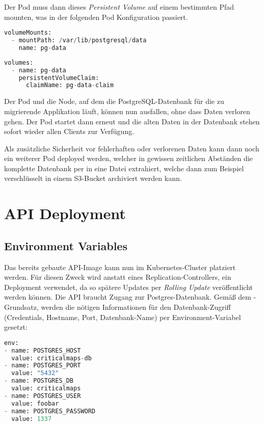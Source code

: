 Der Pod muss dann dieses \emph{Persistent Volume} auf einem bestimmten Pfad
mounten, was in der folgenden Pod Konfiguration passiert.

\begin{lstlisting}[language=Python,numbers=none]
volumeMounts:
  - mountPath: /var/lib/postgresql/data
    name: pg-data\end{lstlisting}
\begin{lstlisting}[language=Python,numbers=none]
volumes:
  - name: pg-data
    persistentVolumeClaim:
      claimName: pg-data-claim\end{lstlisting}

Der Pod und die Node, auf dem die PostgreSQL-Datenbank für die zu
migrierende Applikation läuft, können nun ausfallen, ohne dass Daten verloren
gehen. Der Pod startet dann erneut und die alten Daten
in der Datenbank stehen sofort wieder allen Clients zur Verfügung.

Als zusätzliche Sicherheit vor fehlerhaften oder verlorenen Daten kann dann noch
ein weiterer Pod deployed werden, welcher in gewissen zeitlichen Abständen die
komplette Datenbank per  in eine Datei extrahiert, welche dann
zum Beispiel verschlüsselt in einem S3-Bucket archiviert werden kann.

\section{API Deployment}

\subsection{Environment Variables}
Das bereits gebaute API-Image kann nun im Kubernetes-Cluster platziert werden.
Für diesen Zweck wird anstatt eines Replication-Controllers,
ein Deployment verwendet,
da so spätere Updates per \emph{Rolling Update} veröffentlicht werden können.
Die API braucht Zugang zur Postgres-Datenbank.
Gemäß dem -Grundsatz, werden die nötigen
Informationen für
den Datenbank-Zugriff (Credentials, Hostname, Port, Datenbank-Name)
per Environment-Variabel
gesetzt:
\begin{lstlisting}[language=Python,numbers=none]
env:
- name: POSTGRES_HOST
  value: criticalmaps-db
- name: POSTGRES_PORT
  value: "5432"
- name: POSTGRES_DB
  value: criticalmaps
- name: POSTGRES_USER
  value: foobar
- name: POSTGRES_PASSWORD
  value: 1337\end{lstlisting}

